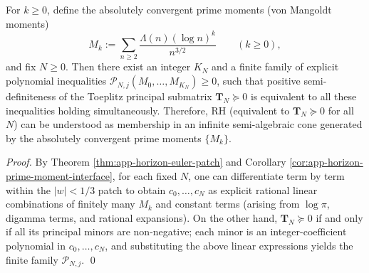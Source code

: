 \begin{theorem}\label{thm:xi-prime-moment-semialgebraic-cone}
For \(k\ge 0\), define the absolutely convergent prime moments (von Mangoldt moments)
\[
M_k:=\sum_{n\ge 2}\frac{\Lambda(n)(\log n)^k}{n^{3/2}}\qquad(k\ge 0),
\]
and fix \(N\ge 0\).
Then there exist an integer \(K_N\) and a finite family of explicit polynomial inequalities
\(\mathcal{P}_{N,j}(M_0,\dots,M_{K_N})\ge 0\), such that positive semi-definiteness of the Toeplitz principal submatrix
\(\mathbf{T}_N\succeq 0\)
is equivalent to all these inequalities holding simultaneously.
Therefore, RH (equivalent to \(\mathbf{T}_N\succeq 0\) for all \(N\)) can be understood as membership in an infinite semi-algebraic cone generated by the absolutely convergent prime moments \(\{M_k\}\).
\end{theorem}

\begin{proof}
By Theorem \ref{thm:app-horizon-euler-patch} and Corollary \ref{cor:app-horizon-prime-moment-interface}, for each fixed \(N\), one can differentiate term by term within the \(|w|<1/3\) patch to obtain \(c_0,\dots,c_N\) as explicit rational linear combinations of finitely many \(M_k\) and constant terms (arising from \(\log\pi\), digamma terms, and rational expansions).
On the other hand, \(\mathbf{T}_N\succeq 0\) if and only if all its principal minors are non-negative; each minor is an integer-coefficient polynomial in \(c_0,\dots,c_N\), and substituting the above linear expressions yields the finite family \(\mathcal{P}_{N,j}\). \qed
\end{proof}

